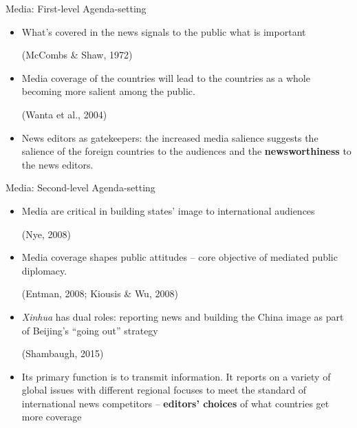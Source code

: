 \documentclass{beamer}
\begin{document}
\begin{frame}{Media: First-level Agenda-setting}


\begin{itemize}
\item What's covered in the news signals to the public what is important \begin{footnotesize} (McCombs \& Shaw, 1972) \end{footnotesize}

\item Media coverage of the countries will lead to the countries as a whole becoming more
salient among the public. \begin{footnotesize} (Wanta et al., 2004) \end{footnotesize}

\item News editors as gatekeepers: the increased media salience suggests the salience of the foreign countries to the audiences and the \textbf{newsworthiness }to the news editors.
\end{itemize}

\end{frame}

\begin{frame}{Media: Second-level Agenda-setting}


\begin{itemize}
\item Media are critical in building states’ image to international audiences \begin{footnotesize} (Nye, 2008) \end{footnotesize}

\item Media coverage shapes public attitudes -- core objective of mediated public diplomacy. \begin{footnotesize} (Entman, 2008; Kiousis \& Wu, 2008) \end{footnotesize}

\item \textit{Xinhua} has dual roles: reporting news and building the China
image as part of Beijing’s “going out” strategy \begin{footnotesize} (Shambaugh, 2015) \end{footnotesize}

\item Its primary function is to transmit information. It reports on a variety of global issues
with different regional focuses to meet the standard of international news competitors -- \textbf{editors' choices} of what countries get more coverage
\end{itemize}

\end{frame}
\end{document}
